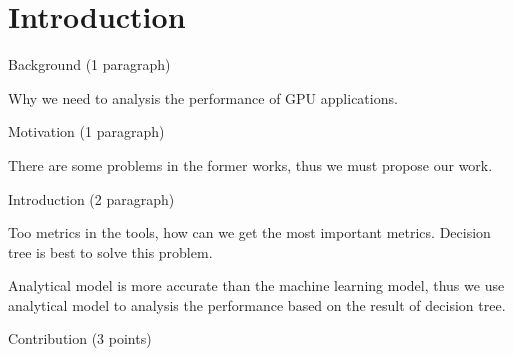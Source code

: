 \section{Introduction}

Background (1 paragraph)

Why we need to analysis the performance of GPU applications.

Motivation (1 paragraph)

There are some problems in the former works, thus we must propose our work.

Introduction (2 paragraph) 


Too metrics in the tools, how can we get the most important metrics. Decision tree is best to solve this problem.


Analytical model is more accurate than the machine learning model, thus we use analytical model to analysis the performance based on the result of decision tree.

Contribution (3 points) 


